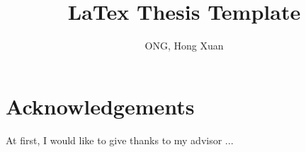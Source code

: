 
\usepackage[utf8]{inputenc}
\usepackage{amsmath}
\usepackage{amsfonts}
\usepackage{amssymb}
\usepackage{graphicx}
\usepackage{caption}
\usepackage{booktabs}
\usepackage{hyperref}

%
\title{LaTex Thesis Template}	%
\author{ONG, Hong Xuan}			%

%
\newcommand{\argmax}{\arg\!\max}


%
\maketitle
\tableofcontents

%
\chapter*{Acknowledgements}
At first, I would like to give thanks to my advisor ...

%
\listoffigures
\listoftables

%
\newpage\cleardoublepage
\newpage\cleardoublepage
\newpage\cleardoublepage
\newpage\cleardoublepage
\newpage\cleardoublepage

\nocite{*}
\newpage\cleardoublepage

